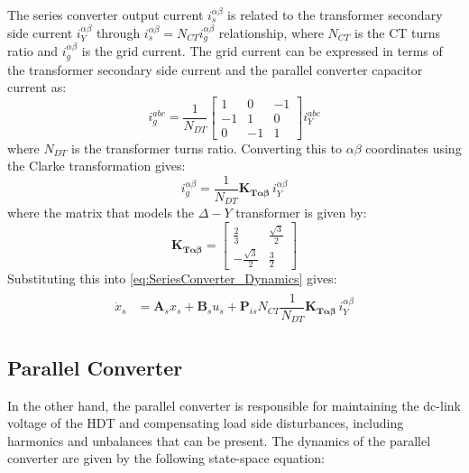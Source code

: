 The series converter output current $i_s^{\alpha\beta}$ is related to the transformer secondary side current $i_Y^{\alpha\beta}$ through $i_s^{\alpha\beta} = N_{CT} i_g^{\alpha\beta}$ relationship, where $N_{CT}$ is the CT turns ratio and $i_g^{\alpha\beta}$ is the grid current. The grid current can be expressed in terms of the transformer secondary side current and the parallel converter capacitor current as:
\begin{equation}
    i_g^{abc} = \dfrac{1}{N_{DT}}
    \begin{bmatrix}
        1 & 0 & -1 \\
        -1 & 1 & 0 \\
        0 & -1 & 1
    \end{bmatrix}
    i_Y^{abc}
\end{equation}
where $N_{DT}$ is the transformer turns ratio. Converting this to $\alpha\beta$ coordinates using the Clarke transformation gives:
\begin{equation}
    i_g^{\alpha\beta} = \dfrac{1}{N_{DT}} \mathbf{K_{T\alpha\beta}}\, i_Y^{\alpha\beta}
\end{equation}
where the matrix that models the $\Delta-Y$ transformer is given by:
\begin{equation}
    \mathbf{K_{T\alpha\beta}} = 
    \begin{bmatrix} 
        \frac{2}{3} & \frac{\sqrt{3}}{2}\\
        -\frac{\sqrt{3}}{2} & \frac{3}{2} 
    \end{bmatrix}
\end{equation}
Substituting this into \eqref{eq:SeriesConverter_Dynamics} gives:
\begin{align}
    \begin{aligned}
        \dot{x}_s &= \mathbf{A}_s x_s + \mathbf{B}_s u_s + \mathbf{P}_{is} N_{CT} \dfrac{1}{N_{DT}} \mathbf{K_{T\alpha\beta}}\, i_Y^{\alpha\beta}
    \end{aligned}
\end{align}

\subsection{Parallel Converter}

In the other hand, the parallel converter is responsible for maintaining the dc-link voltage of the HDT and compensating load side disturbances, including harmonics and unbalances that can be present. The dynamics of the parallel converter are given by the following state-space equation:

